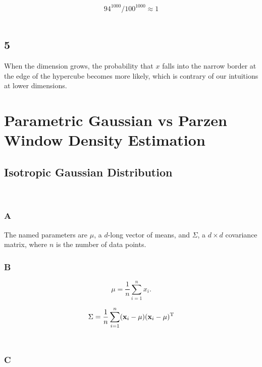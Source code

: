 \documentclass{amsart}
\theoremstyle{definition}
\theoremstyle{remark}
\numberwithin{equation}{section}
\begin{document}
\begin{equation}
    94^{1000} / 100^{1000} \approx 1
\end{equation} \\

\subsection{5} 

When the dimension grows, the probability that $x$ falls into the narrow 
border at the edge of the hypercube becomes more likely, which is contrary of 
our intuitions at lower dimensions. 

\section{Parametric Gaussian vs Parzen Window Density Estimation}

\subsection{Isotropic Gaussian Distribution} \\

\subsubsection{A} 

The named parameters are $\mu$, a $d$-long vector of means, and $\Sigma$, a 
$d \times d$ covariance matrix, where $n$ is the number of data points. \\

\subsubsection{B} 

\begin{equation}
    \mu = \frac{1}{n}\sum_{i=1}^{n}x_{i}.
\end{equation}

\begin{equation}
    \Sigma = {1 \over {n}}\sum_{i=1}^n (\mathbf{x}_i-\mu) (\mathbf{x}_i-\mu)^\mathrm{T}
\end{equation} \\

\subsubsection{C} 
\end{document}
